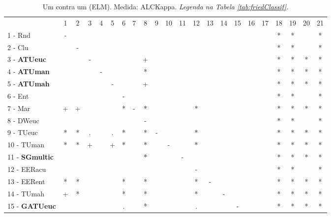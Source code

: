 \begin{table}[h]
\caption{Um contra um (ELM). Medida: ALCKappa. \textit{Legenda na Tabela \ref{tab:friedClassif}.}}
\begin{center}\begin{tabular}{lcc|cc|cc|cc|cc|cc|cc|cc|cc|cc|c}
 			& 1 & 2 & 3 & 4 & 5 & 6 & 7 & 8 & 9 & 10 & 11 & 12 & 13 & 14 & 15 & 16 & 17 & 18 & 19 & 20 & 21\\
1 - Rnd  	& - &   &   &   &   &   &   &   &   &   &   &   &   &   &   &   &   & * & * &   & * \\
2 - Clu  	&   & - &   &   &   &   &   &   &   &   &   &   &   &   &   &   &   & * & * &   & * \\ \hline
3 - \textbf{ATUeuc}	&   &   & - &   &   &   &   & + &   &   &   &   &   &   &   &   &   & * & * & * & * \\
4 - \textbf{ATUman}	&   &   &   & - &   &   &   & * &   &   &   &   &   &   &   &   &   & * & * & * & * \\ \hline
5 - \textbf{ATUmah}	&   &   &   &   & - &   &   & + &   &   &   &   &   &   &   &   &   & * & * & * & * \\
6 - Ent  	&   &   &   &   &   & - &   &   &   &   &   &   &   &   &   &   &   & * & * &   & * \\ \hline
7 - Mar  	& + & + &   &   &   & * & - & * &   &   &   & * &   &   &   &   &   & * & * & * & * \\
8 - DWeuc	&   &   &   &   &   &   &   & - &   &   &   &   &   &   &   &   &   & * & * &   & * \\ \hline
9 - TUeuc	& * & * & . &   & . & * &   & * & - &   &   & * &   &   &   &   &   & * & * & * & * \\
10 - TUman	& * & * & + &   & + & * &   & * &   & - &   & * &   &   &   &   &   & * & * & * & * \\ \hline
11 - \textbf{SGmultic}	&   &   &   &   &   &   &   & * &   &   & - &   &   &   &   &   &   & * & * & * & * \\
12 - EERacu	&   &   &   &   &   &   &   &   &   &   &   & - &   &   &   &   &   & * & * &   & * \\ \hline
13 - EERent	& * & * &   &   &   & * &   & * &   &   &   & * & - &   &   &   &   & * & * & * & * \\
14 - TUmah	& + & * &   &   &   & * &   & * &   &   &   & * &   & - &   &   &   & * & * & * & * \\ \hline
15 - \textbf{GATUeuc}	&   &   &   &   &   & . &   & * &   &   &   & . &   &   & - &   &   & * & * & * & * \\

\end{tabular}
\end{center}
\end{table}
